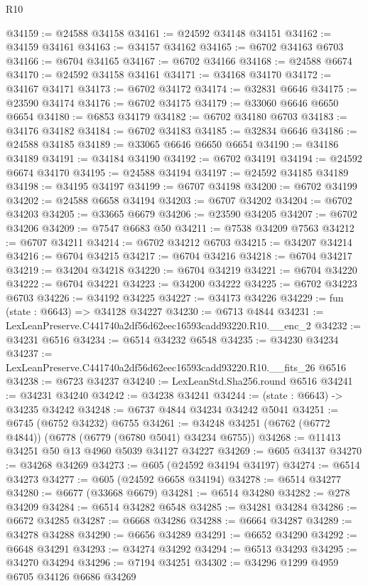 \begin{lexlean}{R10}
\begin{coremodule}
@34159 := @24588 @34158
@34161 := @24592 @34148 @34151
@34162 := @34159 @34161
@34163 := @34157 @34162
@34165 := @6702 @34163 @6703
@34166 := @6704 @34165
@34167 := @6702 @34166
@34168 := @24588 @6674
@34170 := @24592 @34158 @34161
@34171 := @34168 @34170
@34172 := @34167 @34171
@34173 := @6702 @34172
@34174 := @32831 @6646
@34175 := @23590 @34174
@34176 := @6702 @34175
@34179 := @33060 @6646 @6650 @6654
@34180 := @6853 @34179
@34182 := @6702 @34180 @6703
@34183 := @34176 @34182
@34184 := @6702 @34183
@34185 := @32834 @6646
@34186 := @24588 @34185
@34189 := @33065 @6646 @6650 @6654
@34190 := @34186 @34189
@34191 := @34184 @34190
@34192 := @6702 @34191
@34194 := @24592 @6674 @34170
@34195 := @24588 @34194
@34197 := @24592 @34185 @34189
@34198 := @34195 @34197
@34199 := @6707 @34198
@34200 := @6702 @34199
@34202 := @24588 @6658 @34194
@34203 := @6707 @34202
@34204 := @6702 @34203
@34205 := @33665 @6679
@34206 := @23590 @34205
@34207 := @6702 @34206
@34209 := @7547 @6683 @50
@34211 := @7538 @34209 @7563
@34212 := @6707 @34211
@34214 := @6702 @34212 @6703
@34215 := @34207 @34214
@34216 := @6704 @34215
@34217 := @6704 @34216
@34218 := @6704 @34217
@34219 := @34204 @34218
@34220 := @6704 @34219
@34221 := @6704 @34220
@34222 := @6704 @34221
@34223 := @34200 @34222
@34225 := @6702 @34223 @6703
@34226 := @34192 @34225
@34227 := @34173 @34226
@34229 := fun (state : @6643) => @34128 @34227
@34230 := @6713 @4844
@34231 := LexLeanPreserve.C441740a2df56d62eec16593cadd93220.R10.__enc_2
@34232 := @34231 @6516
@34234 := @6514 @34232 @6548
@34235 := @34230 @34234
@34237 := LexLeanPreserve.C441740a2df56d62eec16593cadd93220.R10.__fits_26 @6516
@34238 := @6723 @34237
@34240 := LexLeanStd.Sha256.round @6516
@34241 := @34231 @34240
@34242 := @34238 @34241
@34244 := (state : @6643) -> @34235 @34242
@34248 := @6737 @4844 @34234 @34242 @5041
@34251 := @6745 (@6752 @34232) @6755
@34261 := @34248 @34251 (@6762 (@6772 @4844)) (@6778 (@6779 (@6780 @5041) @34234 @6755))
@34268 := @11413 @34251 @50 @13 @4960 @5039 @34127 @34227
@34269 := @605 @34137
@34270 := @34268 @34269
@34273 := @605 (@24592 @34194 @34197)
@34274 := @6514 @34273
@34277 := @605 (@24592 @6658 @34194)
@34278 := @6514 @34277
@34280 := @6677 (@33668 @6679)
@34281 := @6514 @34280
@34282 := @278 @34209
@34284 := @6514 @34282 @6548
@34285 := @34281 @34284
@34286 := @6672 @34285
@34287 := @6668 @34286
@34288 := @6664 @34287
@34289 := @34278 @34288
@34290 := @6656 @34289
@34291 := @6652 @34290
@34292 := @6648 @34291
@34293 := @34274 @34292
@34294 := @6513 @34293
@34295 := @34270 @34294
@34296 := @7194 @34251
@34302 := @34296 @1299 @4959 @6705 @34126 @6686 @34269

\end{coremodule}
\end{lexlean}
